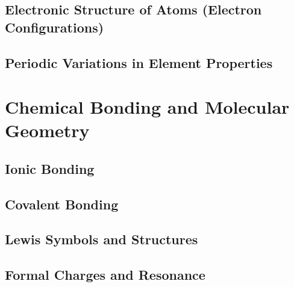 \documentclass[12pt, openany, letterpaper]{memoir}
\begin{document}
\section{Electronic Structure of Atoms (Electron Configurations)}

\section{Periodic Variations in Element Properties}

\chapter{Chemical Bonding and Molecular Geometry}

\section{Ionic Bonding}

\section{Covalent Bonding}

\section{Lewis Symbols and Structures}

\section{Formal Charges and Resonance}
\end{document}
